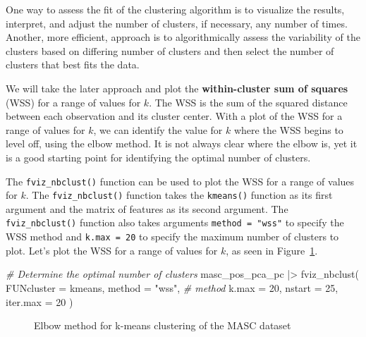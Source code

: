 \documentclass[
  letterpaper,
  DIV=11,
  numbers=noendperiod]{scrreprt}
\newenvironment{Shaded}{\begin{snugshade}}{\end{snugshade}}
\newcommand{\AttributeTok}[1]{\textcolor[rgb]{0.00,0.00,0.00}{#1}}
\newcommand{\CommentTok}[1]{\textcolor[rgb]{0.00,0.00,0.00}{\textit{#1}}}
\newcommand{\DecValTok}[1]{\textcolor[rgb]{0.00,0.00,0.00}{#1}}
\newcommand{\FunctionTok}[1]{\textcolor[rgb]{0.00,0.00,0.00}{#1}}
\newcommand{\NormalTok}[1]{\textcolor[rgb]{0.00,0.00,0.00}{#1}}
\newcommand{\SpecialCharTok}[1]{\textcolor[rgb]{0.00,0.00,0.00}{#1}}
\newcommand{\StringTok}[1]{\textcolor[rgb]{0.00,0.00,0.00}{#1}}
\theoremstyle{definition}
\theoremstyle{remark}
\begin{document}
One way to assess the fit of the clustering algorithm is to visualize
the results, interpret, and adjust the number of clusters, if necessary,
any number of times. Another, more efficient, approach is to
algorithmically assess the variability of the clusters based on
differing number of clusters and then select the number of clusters that
best fits the data.

We will take the later approach and plot the \textbf{within-cluster sum
of squares} (WSS) for a range of values for \(k\). The WSS is the sum of
the squared distance between each observation and its cluster center.
With a plot of the WSS for a range of values for \(k\), we can identify
the value for \(k\) where the WSS begins to level off, using the elbow
method. It is not always clear where the elbow is, yet it is a good
starting point for identifying the optimal number of clusters.

The \texttt{fviz\_nbclust()} function can be used to plot the WSS for a
range of values for \(k\). The \texttt{fviz\_nbclust()} function takes
the \texttt{kmeans()} function as its first argument and the matrix of
features as its second argument. The \texttt{fviz\_nbclust()} function
also takes arguments \texttt{method\ =\ "wss"} to specify the WSS method
and \texttt{k.max\ =\ 20} to specify the maximum number of clusters to
plot. Let's plot the WSS for a range of values for \(k\), as seen in
Figure~\ref{fig-eda-masc-pos-kmeans-elbow}.

\begin{Shaded}
\begin{Highlighting}[]
\CommentTok{\# Determine the optimal number of clusters}
\NormalTok{masc\_pos\_pca\_pc }\SpecialCharTok{|\textgreater{}}
  \FunctionTok{fviz\_nbclust}\NormalTok{(}
    \AttributeTok{FUNcluster =}\NormalTok{ kmeans,}
    \AttributeTok{method =} \StringTok{"wss"}\NormalTok{, }\CommentTok{\# method}
    \AttributeTok{k.max =} \DecValTok{20}\NormalTok{,}
    \AttributeTok{nstart =} \DecValTok{25}\NormalTok{,}
    \AttributeTok{iter.max =} \DecValTok{20}
\NormalTok{  )}
\end{Highlighting}
\end{Shaded}

\begin{figure}[H]


\caption{\label{fig-eda-masc-pos-kmeans-elbow}Elbow method for k-means
clustering of the MASC dataset}

\end{figure}%
\end{document}
